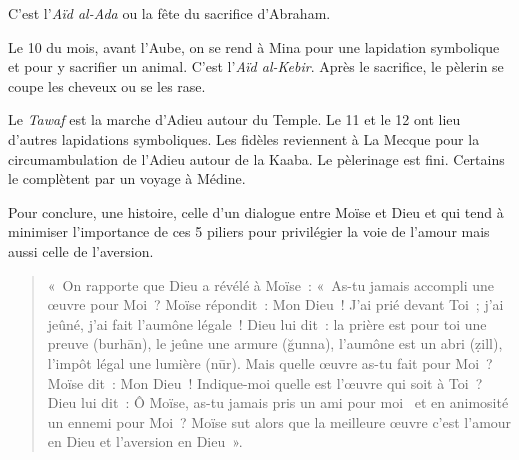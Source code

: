 C'est l'\emph{Aïd al-Ada} ou la fête du sacrifice d'Abraham.

Le 10 du mois, avant l'Aube, on se rend à Mina pour une lapidation
symbolique et pour y sacrifier un animal. C'est l'\emph{Aïd al-Kebir}.
Après le sacrifice, le pèlerin se coupe les cheveux ou se les rase.

Le \emph{Tawaf} est la marche d'Adieu autour du Temple. Le 11 et le 12
ont lieu d'autres lapidations symboliques. Les fidèles reviennent à La
Mecque pour la circumambulation de l'Adieu autour de la Kaaba. Le
pèlerinage est fini. Certains le complètent par un voyage à Médine.


Pour conclure, une histoire, celle d'un dialogue entre Moïse et Dieu et
qui tend à minimiser l'importance de ces 5 piliers pour privilégier la
voie de l'amour mais aussi celle de l'aversion.

\begin{quote}
«~On rapporte que Dieu a révélé à Moïse~: «~As-tu jamais accompli une
œuvre pour Moi~? Moïse répondit~: Mon Dieu~! J'ai prié devant Toi~; j'ai
jeûné, j'ai fait l'aumône légale~! Dieu lui dit~: la prière est pour toi
une preuve (burhān), le jeûne une armure (ğunna), l'aumône est un abri
(ẓill), l'impôt légal une lumière (nūr). Mais quelle œuvre as-tu fait
pour Moi~? Moïse dit~: Mon Dieu~! Indique-moi quelle est l'œuvre qui
soit à Toi~? Dieu lui dit~: Ô Moïse, as-tu jamais pris un ami pour moi~
et en animosité un ennemi pour Moi~? Moïse sut alors que la meilleure
œuvre c'est l'amour en Dieu et l'aversion en Dieu~».
\end{quote}

